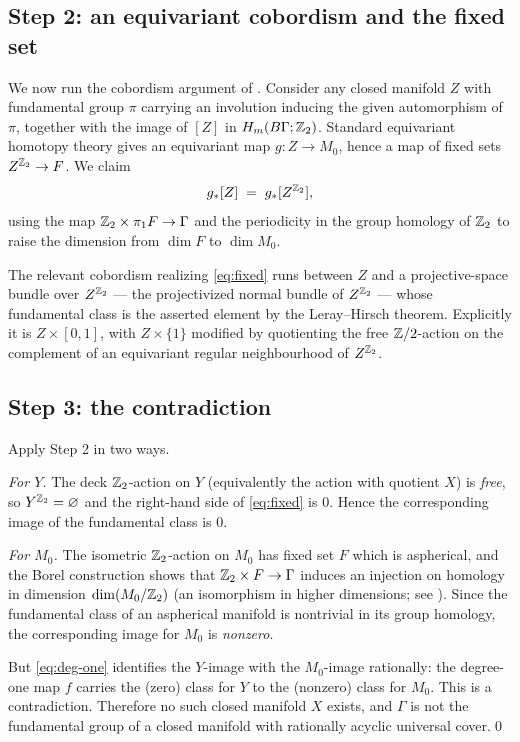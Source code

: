 \documentclass[11pt]{article}
\begin{document}
\subsection*{Step 2: an equivariant cobordism and the fixed set}

We now run the cobordism argument of \cite{W1}. Consider any closed manifold $Z$
with fundamental group $\pi$ carrying an involution inducing the given
automorphism of $\pi$, together with the image of $[Z]$ in $H_m(B\Gamma;\mathbb{Z}_2)$.
Standard equivariant homotopy theory gives an equivariant map $g:Z\to M_0$,
hence a map of fixed sets $Z^{\mathbb{Z}_2}\to F$. We claim
\begin{equation}\label{eq:fixed}
  g_*[Z]\;=\;g_*[Z^{\mathbb{Z}_2}],
\end{equation}
using the map $\mathbb{Z}_2\times\pi_1F\to\Gamma$ and the periodicity in the group
homology of $\mathbb{Z}_2$ to raise the dimension from $\dim F$ to $\dim M_0$.

The relevant cobordism realizing \eqref{eq:fixed} runs between $Z$ and a
projective-space bundle over $Z^{\mathbb{Z}_2}$ --- the projectivized normal bundle of
$Z^{\mathbb{Z}_2}$ --- whose fundamental class is the asserted element by the
Leray--Hirsch theorem. Explicitly it is $Z\times[0,1]$, with $Z\times\{1\}$
modified by quotienting the free $\mathbb{Z}/2$-action on the complement of an
equivariant regular neighbourhood of $Z^{\mathbb{Z}_2}$.

\subsection*{Step 3: the contradiction}

Apply Step 2 in two ways.

\emph{For $Y$.} The deck $\mathbb{Z}_2$-action on $Y$ (equivalently the action with
quotient $X$) is \emph{free}, so $Y^{\mathbb{Z}_2}=\varnothing$ and the right-hand side
of \eqref{eq:fixed} is $0$. Hence the corresponding image of the fundamental
class is $0$.

\emph{For $M_0$.} The isometric $\mathbb{Z}_2$-action on $M_0$ has fixed set $F$ which is
aspherical, and the Borel construction shows that
$\mathbb{Z}_2\times F\to\Gamma$ induces an injection on homology in dimension
$\dim(M_0/\mathbb{Z}_2)$ (an isomorphism in higher dimensions; see \cite{Borel}). Since
the fundamental class of an aspherical manifold is nontrivial in its group
homology, the corresponding image for $M_0$ is \emph{nonzero}.

But \eqref{eq:deg-one} identifies the $Y$-image with the $M_0$-image rationally:
the degree-one map $f$ carries the (zero) class for $Y$ to the (nonzero) class
for $M_0$. This is a contradiction. Therefore no such closed manifold $X$
exists, and $\Gamma$ is not the fundamental group of a closed manifold with
rationally acyclic universal cover.\qed
\end{document}
